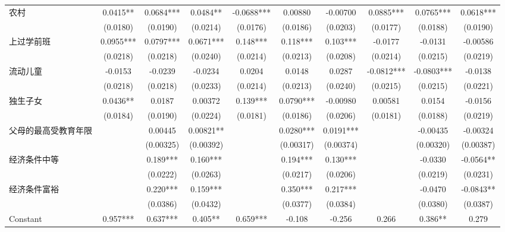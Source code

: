 \documentclass{beamer}
\begin{document}
\begin{frame}
\begin{table}[htbp]
{\begin{tabular}{lccccccccc}
农村           & 0.0415**   & 0.0684***  & 0.0484**   & -0.0688*** & 0.00880    & -0.00700  & 0.0885***  & 0.0765***  & 0.0618*** \\
             & (0.0180)   & (0.0190)   & (0.0214)   & (0.0176)   & (0.0186)   & (0.0203)  & (0.0177)   & (0.0188)   & (0.0190)  \\
上过学前班        & 0.0955***  & 0.0797***  & 0.0671***  & 0.148***   & 0.118***   & 0.103***  & -0.0177    & -0.0131    & -0.00586  \\
             & (0.0218)   & (0.0218)   & (0.0240)   & (0.0214)   & (0.0213)   & (0.0208)  & (0.0214)   & (0.0215)   & (0.0219)  \\
流动儿童         & -0.0153    & -0.0239    & -0.0234    & 0.0204     & 0.0148     & 0.0287    & -0.0812*** & -0.0803*** & -0.0138   \\
             & (0.0218)   & (0.0218)   & (0.0233)   & (0.0214)   & (0.0213)   & (0.0240)  & (0.0215)   & (0.0215)   & (0.0221)  \\
独生子女         & 0.0436**   & 0.0187     & 0.00372    & 0.139***   & 0.0790***  & -0.00980  & 0.00581    & 0.0154     & -0.0156   \\
             & (0.0184)   & (0.0190)   & (0.0224)   & (0.0181)   & (0.0186)   & (0.0206)  & (0.0181)   & (0.0188)   & (0.0219)  \\
父母的最高受教育年限   &            & 0.00445    & 0.00821**  &            & 0.0280***  & 0.0191*** &            & -0.00435   & -0.00324  \\
             &            & (0.00325)  & (0.00392)  &            & (0.00317)  & (0.00374) &            & (0.00320)  & (0.00387) \\
经济条件中等       &            & 0.189***   & 0.160***   &            & 0.194***   & 0.130***  &            & -0.0330    & -0.0564** \\
             &            & (0.0222)   & (0.0263)   &            & (0.0217)   & (0.0206)  &            & (0.0219)   & (0.0231)  \\
经济条件富裕       &            & 0.220***   & 0.159***   &            & 0.350***   & 0.217***  &            & -0.0470    & -0.0843** \\
             &            & (0.0386)   & (0.0432)   &            & (0.0377)   & (0.0384)  &            & (0.0380)   & (0.0387)  \\
Constant     & 0.957***   & 0.637***   & 0.405**    & 0.659***   & -0.108     & -0.256    & 0.266      & 0.386**    & 0.279     \\

\end{tabular}}
\end{table}
\end{frame}
\end{document}
